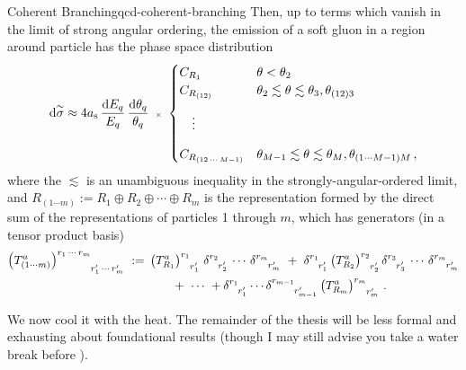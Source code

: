 \begin{lemma}{Coherent Branching}{qcd-coherent-branching}
    Then, up to terms which vanish in the limit of strong angular ordering, the emission of a soft gluon in a region around particle has the phase space distribution
    \begin{align}
        \label{eq:qcd-coherent-branching}
        \dsigmatilde
        \approx
        4 \as
        \,
        \frac{\dd E_q}{E_q}
        \,
        \frac{\dd \theta_q}{\theta_q}
        \,\,\,
        {\scriptscriptstyle\times}
        \,\,
        \begin{cases}
            C_{R_1}
            & \theta < \theta_{2}
            \\
            C_{R_{(12)}}
            & \theta_{2} \lesssim \theta \lesssim
            \theta_{3}, \theta_{(12)3}
            \\[2ex]
            \quad
            \vdots
            &
            \\[2ex]
            C_{R_{(12\,\cdots\,M-1)}}
            & \theta_{M-1} \lesssim \theta \lesssim
            \theta_{M}, \theta_{(1\cdots M-1)M}
            \,,
        \end{cases}
    \end{align}
    where the \(\lesssim\) is an unambiguous inequality in the strongly-angular-ordered limit, and \(R_{(1\cdots m)} := R_1 \oplus R_2 \oplus \cdots \oplus R_m\) is the representation formed by the direct sum of the representations of particles 1 through \(m\), which has generators (in a tensor product basis)
    \begin{align}
        \le(T^a_{(1\cdots m)}\ri)\indices{^{r_1\,\cdots\,r_m}_{r'_1\,\cdots\,r'_m}}
        \,\,
        :=&
        \,\,
        \le(T^a_{R_1}\ri)\indices{^{r_1}_{r'_1}}
        \,
        \delta\indices{^{r_2}_{r'_2}}\,\cdots\,\delta\indices{^{r_m}_{r'_m}}
        \,\,
        +
        \,\,
        \delta\indices{^{r_1}_{r'_1}}
        \le(T^a_{R_2}\ri)\indices{^{r_2}_{r'_2}}
        \delta\indices{^{r_3}_{r'_3}}\,\cdots\,\delta\indices{^{r_m}_{r'_m}}
        \notag
        \\
        &\qquad
        \,\,
        +
        \,\,
        \cdots
        \,\,
        +
        \delta\indices{^{r_1}_{r'_1}}
        \cdots
        \delta\indices{^{r_{m-1}}_{r'_{m-1}}}
        \le(T^a_{R_m}\ri)\indices{^{r_m}_{r'_m}}
        \,.
    \end{align}
\end{lemma}



We now cool it with the heat.
%
The remainder of the thesis will be less formal and exhausting about foundational results (though I may still advise you take a water break before ).



